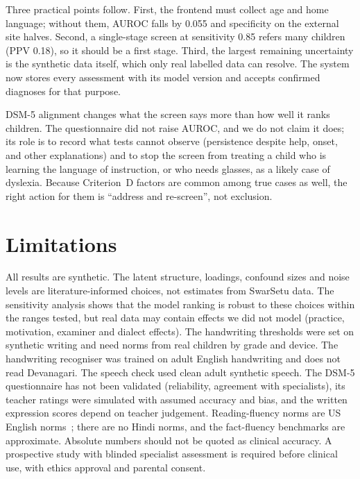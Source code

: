 \documentclass[conference]{IEEEtran}
\begin{document}
Three practical points follow. First, the frontend must collect age and home language;
without them, AUROC falls by 0.055 and specificity on the external site halves.
Second, a single-stage screen at sensitivity 0.85 refers many children (PPV 0.18), so
it should be a first stage. Third, the largest remaining uncertainty is the synthetic
data itself, which only real labelled data can resolve. The system now stores every
assessment with its model version and accepts confirmed diagnoses for that purpose.

DSM-5 alignment changes what the screen says more than how well it ranks children.
The questionnaire did not raise AUROC, and we do not claim it does; its role is to
record what tests cannot observe (persistence despite help, onset, and other
explanations) and to stop the screen from treating a child who is learning the
language of instruction, or who needs glasses, as a likely case of dyslexia. Because
Criterion~D factors are common among true cases as well, the right action for them is
``address and re-screen'', not exclusion.

\section{Limitations}\label{sec:limits}
All results are synthetic. The latent structure, loadings, confound sizes and noise
levels are literature-informed choices, not estimates from SwarSetu data. The
sensitivity analysis shows that the model ranking is robust to these choices within
the ranges tested, but real data may contain effects we did not model (practice,
motivation, examiner and dialect effects). The handwriting thresholds were set on
synthetic writing and need norms from real children by grade and device. The
handwriting recogniser was trained on adult English handwriting and does not read
Devanagari. The speech check used clean adult synthetic speech. The DSM-5
questionnaire has not been validated (reliability, agreement with specialists), its
teacher ratings were simulated with assumed accuracy and bias, and the written
expression scores depend on teacher judgement. Reading-fluency norms are US English
norms~\cite{hasbrouck2017}; there are no Hindi norms, and the fact-fluency benchmarks
are approximate. Absolute numbers
should not be quoted as clinical accuracy. A prospective study with blinded
specialist assessment is required before clinical use, with ethics approval and
parental consent.
\end{document}
